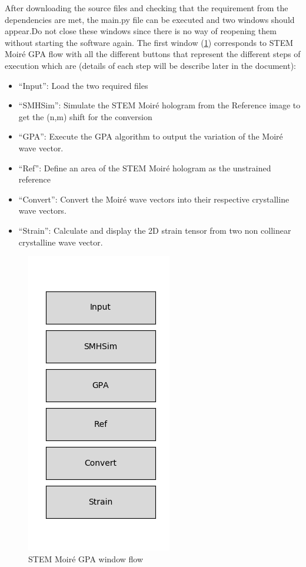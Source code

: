 \documentclass[12pt, titlepage]{article}
\newcommand{\progname}{STEM Moir{\'e} GPA}
\begin{document}
After downloading the source files and checking that the requirement from the dependencies are met, the main.py file can be executed and two windows should appear.Do not close these windows since there is no way of reopening them without starting the software again. The first window (\cref{fig:SMG_Flow}) corresponds to \progname{} flow with all the different buttons that represent the different steps of execution which are (details of each step will be describe later in the document):
\begin{itemize}
\item \enquote{Input}: Load the two required files
\item \enquote{SMHSim}: Simulate the STEM Moir{\'e} hologram from the Reference image to get the (n,m) shift for the conversion
\item \enquote{GPA}: Execute the GPA algorithm to output the variation of the Moir{\'e} wave vector.
\item \enquote{Ref}: Define an area of the STEM Moir{\'e} hologram as the unstrained reference
\item \enquote{Convert}: Convert the Moir{\'e} wave vectors into their respective crystalline wave vectors.
\item \enquote{Strain}: Calculate and display the 2D strain tensor from two non collinear crystalline wave vector.
\end{itemize}

\begin{figure}[H]
\centering
\includegraphics[scale=1]{Figures/SMG_Flow.png}
\caption{\progname{} window flow}
\label{fig:SMG_Flow}
\end{figure}
\end{document}
